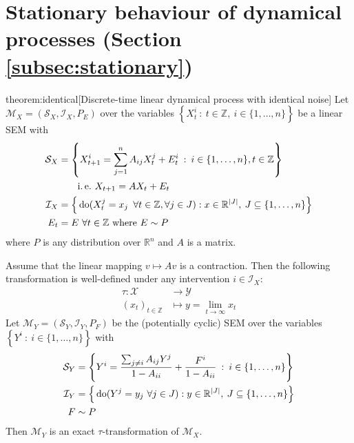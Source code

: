 \section{Stationary behaviour of dynamical processes (Section \ref{subsec:stationary})}\label{subsec:causality-appendix-dynamical-proof}


\begin{reptheorem}{theorem:identical}[Discrete-time linear dynamical process with identical noise]
Let $\mathcal{M}_X = \left(\mathcal{S}_X, \mathcal{I}_X, P_{E} \right)$ over the variables ${\left\lbrace X_t^i \: : \: t \in \mathbb{Z}, \: i\in \{1,\ldots,n\} \right\rbrace}$ be a linear SEM with
%
\begin{align*}
\mathcal{S}_X &= \left\lbrace X_{t+1}^i = \sum_{j=1}^n A_{ij}X_t^j + E_t^i \:  : \: i \in \{1,\ldots,n\}, t\in\mathbb{Z} \right\rbrace \\
&\qquad\text{i.\,e.}\ X_{t+1} = AX_t + E_t \\
%
\mathcal{I}_X &= \Big{\{} \doop(X_t^j= x_j \enspace \forall t \in \mathbb{Z},\forall j \in J):  x \in \mathbb{R}^{|J|}, \: J \subseteq \{1,\ldots,n\} \Big{\}} \\
%
E_t &= E\ \forall t\in\mathbb{Z} \text{ where } E \sim P
\end{align*}
%
where $P$ is any distribution over $\mathbb{R}^n$ and $A$ is a matrix.

Assume that the linear mapping $v\mapsto Av$ is a contraction.
Then the following transformation is well-defined under any intervention $i\in\mathcal{I}_X$:
%
\begin{align*}
\tau : \mathcal{X} &\rightarrow \mathcal{Y} \\
(x_t)_{t\in \mathbb{Z}} & \mapsto y= \lim_{t\rightarrow \infty} x_t
\end{align*}
%
Let ${\mathcal{M}_Y = \left(\mathcal{S}_Y, \mathcal{I}_Y, P_{F} \right)}$ be the (potentially cyclic) SEM over the variables ${\left\lbrace Y^i \: :  \: i\in \{1,\ldots,n\} \right\rbrace}$  with
%
\begin{align*}
\mathcal{S}_Y &= \left\lbrace Y^i = \frac{\sum_{j\not=i} A_{ij}Y^j}{1-A_{ii}} + \frac{F^i}{1-A_{ii}} \:  : \: i \in \{1,\ldots,n\} \right\rbrace \\
%
\mathcal{I}_Y &= \Big{\{} \doop(Y^j= y_j \ \forall j \in J) : y \in \mathbb{R}^{|J|}, \: J \subseteq \{1,\ldots,n\} \Big{\}} \\
%
F &\sim P
\end{align*}
%
Then $\mathcal{M}_Y$ is an exact $\tau$-transformation of $\mathcal{M}_X$.
\end{reptheorem}


